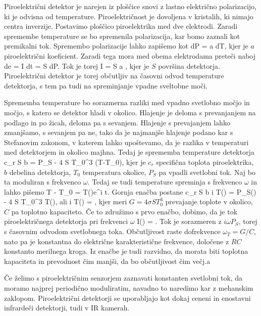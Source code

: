 Piroelektrični detektor je narejen iz ploščice snovi z lastno električno polarizacijo, ki 
je odvisna od temperature. Piroelektričnost  je dovoljena v kristalih, ki nimajo centra 
inverzije. Postavimo ploščico piroelektrika med dve elektrodi. Zaradi spremembe temperature se 
bo spremenila polarizacija, kar bomo zaznali kot premikalni tok. Spremembo polarizacije lahko zapišemo
kot 
\beq
dP = a dT,
\eeq
kjer je $a$ piroelektrični koeficient. Zaradi tega mora med obema elektrodama preteči naboj
\beq
de = I dt = S dP.
\eeq
Tok je torej
\beq
I = S a ,
\eeq
kjer je $S$ površina detektorja. Piroelektrični detektor je torej občutljiv na časovni
odvod temperature detektorja, s tem pa tudi na spreminjanje vpadne sveltobne moči. 

Sprememba temperature bo sorazmerna razliki med vpadno svetlobno močjo in močjo, s katero
se detektor hladi v okolico. Hlajenje je deloma s prevanjanjem na podlago in po žicah, deloma pa s
sevanjem. Hlajenje s prevajanjem lahko zmanjšamo, s sevanjem pa ne, tako da je najmanjše
hlajenje podano kar s Stefanovim zakonom, v katerem lahko upoštevamo, da je razlika
v temperaturi med detektorjem in okolico majhna. Tedaj je sprememba temperature detektorja
\beq
c_r \varrho S b  = P_S - 4 \sigma S T_0^3 (T-T_0),
\eeq
kjer je $c_r$ specifična toplota piroelektrika, $b$ debelina detektorja, $T_0$ temperatura
okolice, $P_S$ pa vpadli svetlobni tok. Naj bo ta moduliran s frekvenco $\omega$. Tedaj se tudi
temperature spreminja s frekvenco $\omega$ in lahko pišemo
\beq
T - T_0 = T(\omega)e^{i \omega t}.
\eeq
Gornja enačba postane
\beq
c_r \varrho S b i \omega T(\omega) = P_S(\omega) - 4 \sigma S T_0^3 T(\omega),
\eeq
ali
\beq
i \omega T(\omega) = ,
\eeq
kjer meri $G = 4 \sigma S T_0^3$ prevajanje toplote v okolico, $C$ pa toplotno
kapaciteto. Če to združimo s prvo enačbo, dobimo, da je tok piroelektričnega detektorja
pri frekvenci $\omega$ 
\beq
I(\omega) = .
\eeq
Tok je sorazmeren z $i\omega P_S$, torej s časovnim odvodom svetlobnega toka. Občutljivost
raste dofrekvence $\omega_T = G/C$, nato pa je konstantna do električne karakteristične frekvence,
določene z $RC$ konstanto merilnega kroga. Iz enačbe je tudi razvidno, da morata biti toplotna
kapaciteta in prevodnost čim manjši, da bo občutljivost čim večj.a

Če želimo s piroelektričnim senzorjem zaznavati konstanten svetlobni tok, da moramo najprej
periodično moduliratim, navadno to naredimo kar z mehanskim zaklopom. Piroelektrični detektorji
se uporabljajo kot dokaj ceneni in enostavni infrardeči detektorji, tudi v IR kamerah. 



